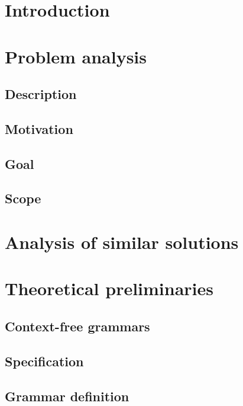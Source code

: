 \documentclass[english,engineering]{wizthesis}
\begin{document}
\tableofcontents

\mainmatter %

{\backmatter %
\chapter{Introduction}}

\chapter{Problem analysis}

\section{Description}

\section{Motivation}

\section{Goal}

\section{Scope}

\chapter{Analysis of similar solutions}

\chapter{Theoretical preliminaries}

\section{Context-free grammars}

\section{Specification}

\section{Grammar definition}
\end{document}
